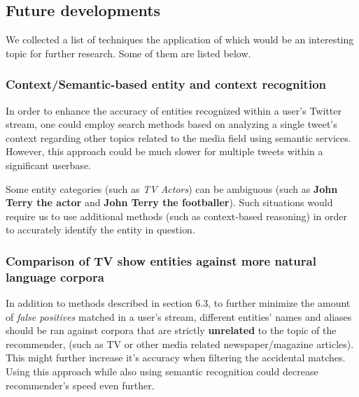 \subsection{Future developments}

We collected a list of techniques the application of which would be an
interesting topic for further research. Some of them are listed below.

\subsubsection{Context/Semantic-based entity and context recognition}

In order to enhance the accuracy of entities recognized within a user's Twitter
stream, one could employ search methods based on analyzing a single tweet's
context regarding other topics related to the media field using semantic
services.  However, this approach could be much slower for multiple tweets
within a significant userbase.

Some entity categories (such as \textit{TV Actors}) can be ambiguous
(such as \textbf{John Terry the actor} and \textbf{John Terry the footballer}).
Such situations would require us to use additional methods (such as context-based
reasoning) in order to accurately identify the entity in question.

\subsubsection{Comparison of TV show entities against more natural language corpora}

In addition to methods described in section 6.3, to further minimize the amount of \textit{false positives}
matched in a user's stream, different entities' names and aliases should be ran against corpora
that are strictly \textbf{unrelated} to the topic of the recommender, (such as TV or other media related
newspaper/magazine articles). This might further increase it's accuracy when filtering the accidental
matches. Using this approach while also using semantic recognition could decrease recommender's
speed even further.
